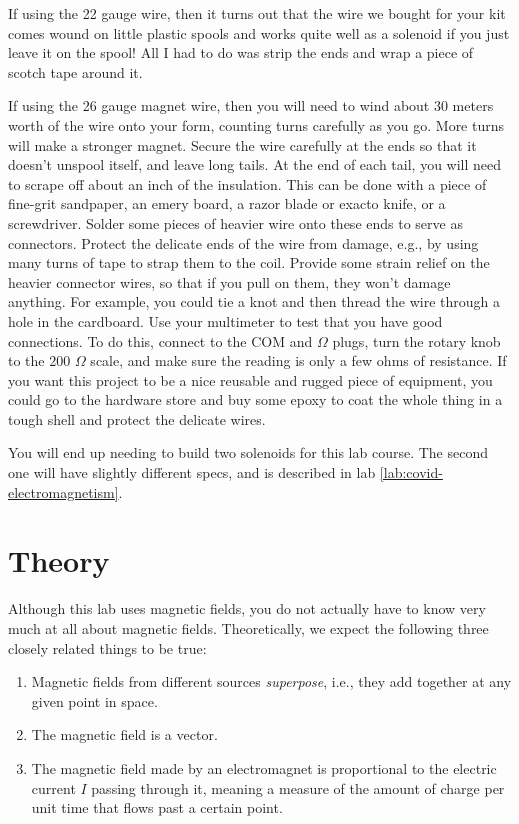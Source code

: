 If using the 22 gauge wire, then
it turns out that the wire we bought for your kit comes wound on little plastic spools
and works quite well as a solenoid if you just leave it on the spool! All I had to do was strip the ends and wrap a piece of
scotch tape around it.

If using the 26 gauge magnet wire, then you will need to wind about 30 meters worth
of the wire onto your form, counting turns carefully as you go. More turns will make a stronger
magnet. Secure the wire carefully
at the ends so that it doesn't unspool itself, and leave long tails. At the end of each tail,
you will need to scrape off about an inch of the insulation. This can be done with a piece of
fine-grit sandpaper, an emery board, a razor blade or exacto knife, or a screwdriver.
Solder some pieces of heavier wire onto these ends to serve as connectors. Protect the
delicate ends of the wire from damage, e.g., by using many turns of tape to strap them
to the coil. Provide some strain relief on the heavier connector wires, so that if you pull
on them, they won't damage anything. For example, you could tie a knot and then thread the
wire through a hole in the cardboard. Use your multimeter to test that you have good connections.
To do this, connect to the COM and $\Omega$ plugs, turn the rotary knob to the 200 $\Omega$ scale,
and make sure the reading is only a few ohms of resistance. If you want this project to be
a nice reusable and rugged piece of equipment, you could go to the hardware store and buy some
epoxy to coat the whole thing in a tough shell and protect the delicate wires.

You will end up needing to build two solenoids for this lab course. The second one will have
slightly different specs, and is described in lab \ref{lab:covid-electromagnetism}.

\section*{Theory}

Although this lab uses magnetic fields, you do not actually have to know very much at all about magnetic fields.
Theoretically, we expect the following three closely related things to be true:

\begin{enumerate}
\item Magnetic fields from different sources \emph{superpose}, i.e., they add together at any given point in space.
\item The magnetic field is a vector.
\item The magnetic field made by an electromagnet is proportional to the electric
current $I$ passing through it, meaning a measure of the amount of charge per unit time that flows past a certain point.
\end{enumerate}

